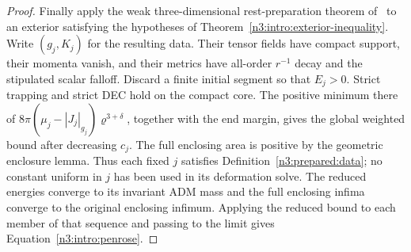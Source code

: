 \begin{proof}
Finally apply the weak three-dimensional rest-preparation theorem
of~\cite[Proposition~7.13]{NumericalCompanion} to an exterior satisfying the hypotheses
of Theorem~\ref{n3:intro:exterior-inequality}.
Write $(g_j,K_j)$ for the resulting data. Their tensor fields have
compact support, their momenta vanish, and their metrics have all-order
$r^{-1}$ decay and the stipulated scalar falloff. Discard a finite
initial segment so that $E_j>0$. Strict trapping and strict DEC hold
on the compact core. The positive minimum there of
$8\pi(\mu_j-|J_j|_{g_j})\varrho^{3+\delta}$, together with the
end margin, gives the global weighted bound after decreasing $c_j$.
The full enclosing area is positive by the geometric enclosure
lemma. Thus each fixed $j$ satisfies Definition~\ref{n3:prepared:data};
no constant uniform in $j$ has been used in its deformation solve.
The reduced energies converge to its invariant ADM mass and the
full enclosing infima converge to the original enclosing infimum.
Applying the reduced bound to each member of that sequence and passing
to the limit gives Equation~\eqref{n3:intro:penrose}.
\end{proof}
